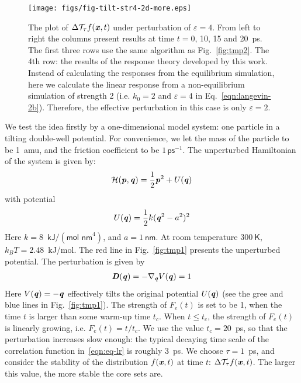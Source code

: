 \documentclass[aip,jcp,a4paper,reprint,onecolumn]{revtex4-1}
\newcommand{\vect}[1]{\textbf{\textit{#1}}}
\newcommand{\mh}{\mathcal H}
\newcommand{\eps}{\varepsilon}
\newcommand{\mt}{\mathcal T}
\begin{document}
\begin{figure}
  \centering
  \texttt{[image: figs/fig-tilt-str4-2d-more.eps]}
  \caption{The plot of $\Delta\mt_\tau f(\vect x,t)$  under perturbation of
    $\eps = 4$. From left to right the
    columns present results at time $t = 0$, 10, 15 and
    20~\textsf{ps}.
    The first three rows use the same algorithm as Fig.~\ref{fig:tmp2}.    
    The 4th row: the results of the response theory developed by this work.
    Instead of calculating the responses from the equilibrium simulation,
    here we calculate the linear response from a non-equilibrium simulation
    of strength 2 (i.e. $k_0 = 2$ and $\eps = 4$
    in Eq.~\eqref{eqn:langevin-2b}).
    Therefore, the effective perturbation in this case is only
    $\eps = 2$.
  }
  \label{fig:tmp3}
\end{figure}

We test the idea firstly by a one-dimensional model system: one particle in a
tilting double-well potential. For convenience, we let the mass of the
particle to be 1~\textsf{amu},
and the friction coefficient to be $1\,\textsf{ps}^{-1}$.
The unperturbed
Hamiltonian of the system is given by:
\begin{align}
  \mh (\vect p, \vect q) = \frac 12 \vect p^2 + U(\vect q) 
\end{align}
with potential
\begin{align}
  U(\vect q) = \frac12 k (\vect q^2 - a^2)^2
\end{align}
Here $k = 8$~$\textsf{kJ} / (\textsf{mol nm}^4)$, and $ a = 1\ \textsf{nm}$.
At room temperature $300\ \textsf{K}$, $k_BT = 2.48$~\textsf{kJ/mol}.
The red line in Fig.~\ref{fig:tmp1} presents the unperturbed potential.
The perturbation is given by
\begin{align}
  \vect D(\vect q) = -\nabla_{\vect q} V(\vect q) = 1
\end{align}
Here $V(\vect q) = -\vect q$   effectively tilts the original
potential $U(\vect q)$ (see the gree and blue lines in Fig.~\ref{fig:tmp1}).
The strength of $F_e(t)$ is
set to be 1, when the time $t$ is larger than some warm-up time $t_c$.
When $t \leq t_c$, the strength of $F_e(t)$ is linearly growing,
i.e. $ F_e(t) = t/t_c$.
We use the value $t_c = 20$~\textsf{ps}, so that the perturbation increases slow
enough: the typical decaying time scale of the correlation function
in~\eqref{eqn:eq-lr} is roughly 3~\textsf{ps}.
We choose $\tau = 1$~\textsf{ps}, and
consider the stability of the
distribution $f(\vect x, t)$ at time $t$: $\Delta\mt_\tau f(\vect x, t)$.
The larger
this value, the more stable the core sets are.
\end{document}
